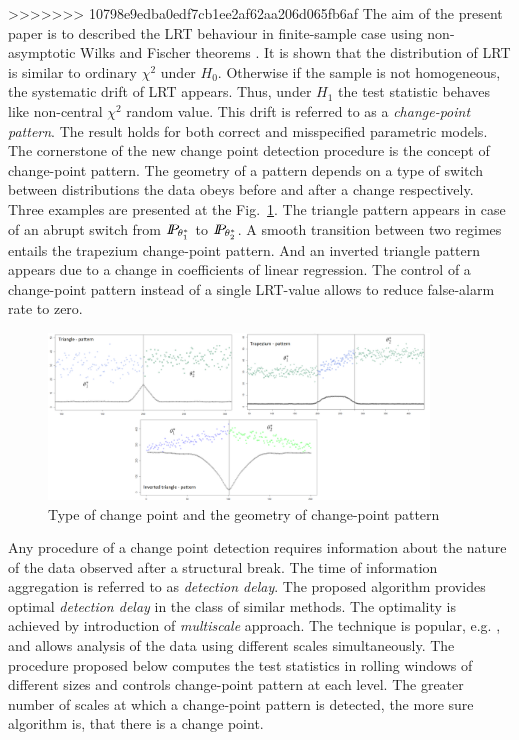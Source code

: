 >>>>>>> 10798e9edba0edf7cb1ee2af62aa206d065fb6af
The aim of the present paper is to described the LRT behaviour in finite-sample case using non-asymptotic Wilks and Fischer theorems \citet{wilks2013}. It is shown that the distribution of LRT is similar to ordinary $\chi^2$ under $H_0$. Otherwise if the sample is not homogeneous, the systematic drift of LRT appears. Thus, under $H_1$ the test statistic behaves like non-central $\chi^2$ random value. This drift is referred to as a \textit{change-point pattern}. The result holds for both correct and misspecified parametric models. 
The cornerstone of the new change point detection procedure is the concept of change-point pattern. The geometry of a pattern depends on a type of switch between distributions the data obeys before and after a change respectively. Three examples are presented at the Fig.~\ref{fig:patterns}. The triangle pattern appears in case of an abrupt switch from $\P_{\theta_1^*}$ to $\P_{\theta_2^*}$. A smooth transition between two regimes entails the trapezium change-point pattern. And an inverted triangle pattern appears due to a change in coefficients of linear regression. The control of a change-point pattern instead of a single LRT-value allows to reduce false-alarm rate to zero.

\begin{figure}[!h]
    \centering
    \includegraphics[width=0.9\textwidth, height=0.45\textwidth]{images/patterns-3.png}
    \caption{Type of change point and the geometry of change-point pattern}
    \label{fig:patterns}
\end{figure}

Any procedure of a change point detection requires information about the nature of the data observed after a structural break. The time of information aggregation is referred to as \textit{detection delay}. The proposed algorithm provides optimal \textit{detection delay} in the class of similar methods. The optimality is achieved by introduction of \textit{multiscale} approach. The technique is popular, e.g. \citet{multiscaleCP1}, \citet{SpokoinyCP} and allows analysis of the data using different scales simultaneously. The procedure proposed below computes the test statistics in rolling windows of different sizes and controls change-point pattern at each level. The greater number of scales at which a change-point pattern is detected, the more sure algorithm is, that there is a change point. 

